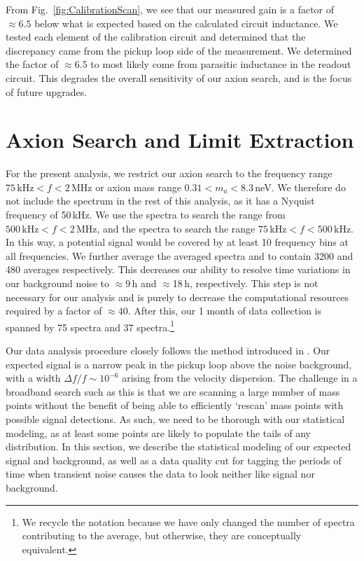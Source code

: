 \documentclass[aps,prd,amsmath,amssymb,reprint,superscriptaddress, nofootinbib,
]{revtex4-1}
\begin{document}
From Fig.~\ref{fig:CalibrationScan}, we see that our measured gain is a factor of $\approx6.5$ below what is expected based on the calculated circuit inductance. We tested each element of the calibration circuit and determined that the discrepancy came from the pickup loop side of the measurement. We determined the factor of $\approx$6.5 to most likely come from parasitic inductance in the readout circuit. This degrades the overall sensitivity of our axion search, and is the focus of future upgrades. 
\section{Axion Search and Limit Extraction}
\label{sec:DataAnalysis}

For the present analysis, we restrict our axion search to the frequency range $75\,\mathrm{kHz} < f < 2\,\mathrm{MHz}$ or axion mass range $0.31 <m_a<8.3$\,neV. We therefore do not include the \Phun spectrum in the rest of this analysis, as it has a Nyquist frequency of 50\,kHz. We use the \Pten spectra to search the range from $500\,\mathrm{kHz} < f < 2\,\mathrm{MHz}$, and the \Pone spectra to search the range $75\,\mathrm{kHz}<f<500\,\mathrm{kHz}$. In this way, a potential signal would be  covered by at least 10 frequency bins at all frequencies. We further average the averaged spectra \Pten and \Pone to contain 3200 and 480 averages respectively. This decreases our ability to resolve time variations in our background noise to $\approx$9\,h and $\approx$18\,h, respectively. This step is not necessary for our analysis and is purely to decrease the computational resources required by a factor of $\approx40$. After this, our 1 month of data collection is spanned by 75 \Pten spectra and 37 \Pone spectra.\footnote{We recycle the notation because we have only changed the number of spectra contributing to the average, but otherwise, they are conceptually equivalent.}

Our data analysis procedure closely follows the method introduced in \cite{Foster2018}.  Our expected signal is a narrow peak in the pickup loop \PSD above the noise background, with a width $\Delta f/f\sim10^{-6}$ arising from the \ADM velocity dispersion. The challenge in a broadband search such as this is that we are scanning a large number of mass points without the benefit of being able to efficiently `rescan' mass points with possible signal detections. As such, we need to be thorough with our statistical modeling, as at least some points are likely to populate the tails of any distribution. In this section, we describe the statistical modeling of our expected signal and background, as well as a data quality cut for tagging the periods of time when transient noise causes the data to look neither like signal nor background.
\end{document}
